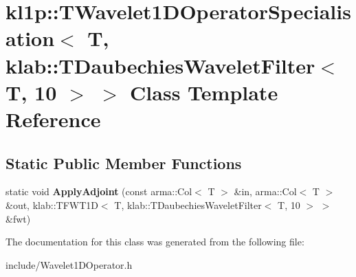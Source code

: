 \hypertarget{classkl1p_1_1TWavelet1DOperatorSpecialisation_3_01T_00_01klab_1_1TDaubechiesWaveletFilter_3_01T_00_0110_01_4_01_4}{}\section{kl1p\+:\+:T\+Wavelet1\+D\+Operator\+Specialisation$<$ T, klab\+:\+:T\+Daubechies\+Wavelet\+Filter$<$ T, 10 $>$ $>$ Class Template Reference}
\label{classkl1p_1_1TWavelet1DOperatorSpecialisation_3_01T_00_01klab_1_1TDaubechiesWaveletFilter_3_01T_00_0110_01_4_01_4}
\subsection*{Static Public Member Functions}
\begin{DoxyCompactItemize}
\item 
static void {\bfseries Apply\+Adjoint} (const arma\+::\+Col$<$ T $>$ \&in, arma\+::\+Col$<$ T $>$ \&out, klab\+::\+T\+F\+W\+T1D$<$ T, klab\+::\+T\+Daubechies\+Wavelet\+Filter$<$ T, 10 $>$ $>$ \&fwt)\hypertarget{classkl1p_1_1TWavelet1DOperatorSpecialisation_3_01T_00_01klab_1_1TDaubechiesWaveletFilter_3_01T_00_0110_01_4_01_4_a52316c8102e392ccfa422c2da17482e1}{}\label{classkl1p_1_1TWavelet1DOperatorSpecialisation_3_01T_00_01klab_1_1TDaubechiesWaveletFilter_3_01T_00_0110_01_4_01_4_a52316c8102e392ccfa422c2da17482e1}

\end{DoxyCompactItemize}


The documentation for this class was generated from the following file\+:\begin{DoxyCompactItemize}
\item 
include/Wavelet1\+D\+Operator.\+h\end{DoxyCompactItemize}
